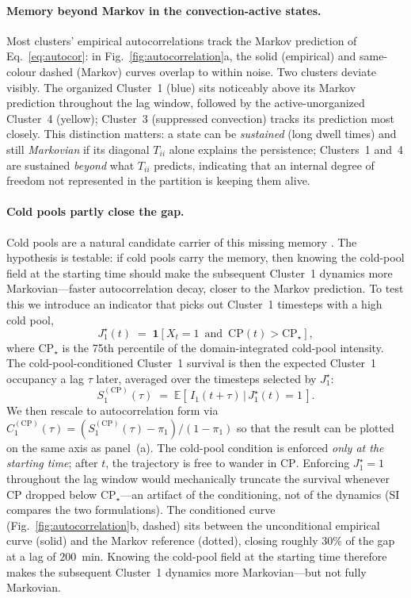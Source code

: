 \documentclass[11pt]{article}
\begin{document}
\paragraph{Memory beyond Markov in the convection-active states.}
Most clusters' empirical autocorrelations track the Markov prediction of Eq.~\ref{eq:autocor}: in Fig.~\ref{fig:autocorrelation}a, the solid (empirical) and same-colour dashed (Markov) curves overlap to within noise. Two clusters deviate visibly. The organized Cluster~1 (blue) sits noticeably above its Markov prediction throughout the lag window, followed by the active-unorganized Cluster~4 (yellow); Cluster~3 (suppressed convection) tracks its prediction most closely. This distinction matters: a state can be \emph{sustained} (long dwell times) and still \emph{Markovian} if its diagonal $T_{ii}$ alone explains the persistence; Clusters~1 and~4 are sustained \emph{beyond} what $T_{ii}$ predicts, indicating that an internal degree of freedom not represented in the partition is keeping them alive.

\paragraph{Cold pools partly close the gap.}
Cold pools are a natural candidate carrier of this missing memory \citep{tompkins2001coldpools, houze1977structure, rotunno1988theory}. The hypothesis is testable: if cold pools carry the memory, then knowing the cold-pool field at the starting time should make the subsequent Cluster~1 dynamics more Markovian---faster autocorrelation decay, closer to the Markov prediction. To test this we introduce an indicator that picks out Cluster~1 timesteps with a high cold pool,
\begin{equation}
J_1^\star(t) \;=\; \mathbf{1}\!\left[X_t = 1 \,\text{ and }\, \mathrm{CP}(t) > \mathrm{CP}_\star\right],
\end{equation}
where $\mathrm{CP}_\star$ is the 75th percentile of the domain-integrated cold-pool intensity. The cold-pool-conditioned Cluster~1 survival is then the expected Cluster~1 occupancy a lag $\tau$ later, averaged over the timesteps selected by $J_1^\star$:
\begin{equation}
S^{(\mathrm{CP})}_1(\tau) \;=\; \mathbb{E}\!\left[\,I_1(t+\tau) \,\big|\, J_1^\star(t) = 1\,\right].
\end{equation}
We then rescale to autocorrelation form via $C^{(\mathrm{CP})}_1(\tau) = (S^{(\mathrm{CP})}_1(\tau) - \pi_1)/(1-\pi_1)$ so that the result can be plotted on the same axis as panel~(a). The cold-pool condition is enforced \emph{only at the starting time}; after $t$, the trajectory is free to wander in $\mathrm{CP}$. Enforcing $J_1^\star = 1$ throughout the lag window would mechanically truncate the survival whenever $\mathrm{CP}$ dropped below $\mathrm{CP}_\star$---an artifact of the conditioning, not of the dynamics (SI compares the two formulations). The conditioned curve (Fig.~\ref{fig:autocorrelation}b, dashed) sits between the unconditional empirical curve (solid) and the Markov reference (dotted), closing roughly $30\%$ of the gap at a lag of $200$~min. Knowing the cold-pool field at the starting time therefore makes the subsequent Cluster~1 dynamics more Markovian---but not fully Markovian.
\end{document}
